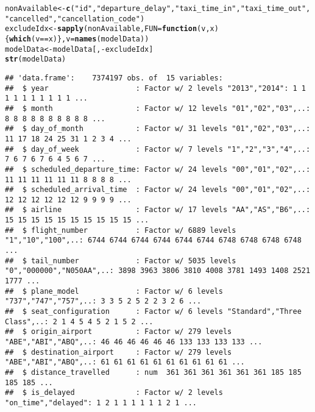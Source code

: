 \documentclass{article}\usepackage[]{graphicx}\usepackage[]{color}
\makeatletter
\newcommand{\hlstr}[1]{\textcolor[rgb]{0.192,0.494,0.8}{#1}}%
\newcommand{\hlopt}[1]{\textcolor[rgb]{0,0,0}{#1}}%
\newcommand{\hlstd}[1]{\textcolor[rgb]{0.345,0.345,0.345}{#1}}%
\newcommand{\hlkwa}[1]{\textcolor[rgb]{0.161,0.373,0.58}{\textbf{#1}}}%
\newcommand{\hlkwb}[1]{\textcolor[rgb]{0.69,0.353,0.396}{#1}}%
\newcommand{\hlkwc}[1]{\textcolor[rgb]{0.333,0.667,0.333}{#1}}%
\newcommand{\hlkwd}[1]{\textcolor[rgb]{0.737,0.353,0.396}{\textbf{#1}}}%
\newenvironment{kframe}{%
 \def\at@end@of@kframe{}%
 \ifinner\ifhmode%
  \def\at@end@of@kframe{\end{minipage}}%
  \begin{minipage}{\columnwidth}%
 \fi\fi%
 \def\FrameCommand##1{\hskip\@totalleftmargin \hskip-\fboxsep
 \colorbox{shadecolor}{##1}\hskip-\fboxsep
     \hskip-\linewidth \hskip-\@totalleftmargin \hskip\columnwidth}%
 \MakeFramed {\advance\hsize-\width
   \@totalleftmargin\z@ \linewidth\hsize
   \@setminipage}}%
 {\par\unskip\endMakeFramed%
 \at@end@of@kframe}
\newenvironment{knitrout}{}{} %
\makeatother
\begin{document}
\begin{knitrout}
\color{fgcolor}\begin{kframe}
\begin{alltt}
\hlstd{nonAvailable} \hlkwb{<-} \hlkwd{c}\hlstd{(}\hlstr{"id"}\hlstd{,} \hlstr{"departure_delay"}\hlstd{,} \hlstr{"taxi_time_in"}\hlstd{,} \hlstr{"taxi_time_out"}\hlstd{,}
                  \hlstr{"cancelled"}\hlstd{,} \hlstr{"cancellation_code"}\hlstd{)}
\hlstd{excludeIdx} \hlkwb{<-} \hlkwd{sapply}\hlstd{(nonAvailable,} \hlkwc{FUN}\hlstd{=}\hlkwa{function}\hlstd{(}\hlkwc{v}\hlstd{,} \hlkwc{x}\hlstd{)\{} \hlkwd{which}\hlstd{(v}\hlopt{==}\hlstd{x)\},} \hlkwc{v}\hlstd{=}\hlkwd{names}\hlstd{(modelData))}
\hlstd{modelData} \hlkwb{<-} \hlstd{modelData[,}\hlopt{-}\hlstd{excludeIdx]}
\hlkwd{str}\hlstd{(modelData)}
\end{alltt}
\begin{verbatim}
## 'data.frame':	7374197 obs. of  15 variables:
##  $ year                    : Factor w/ 2 levels "2013","2014": 1 1 1 1 1 1 1 1 1 1 ...
##  $ month                   : Factor w/ 12 levels "01","02","03",..: 8 8 8 8 8 8 8 8 8 8 ...
##  $ day_of_month            : Factor w/ 31 levels "01","02","03",..: 11 17 18 24 25 31 1 2 3 4 ...
##  $ day_of_week             : Factor w/ 7 levels "1","2","3","4",..: 7 6 7 6 7 6 4 5 6 7 ...
##  $ scheduled_departure_time: Factor w/ 24 levels "00","01","02",..: 11 11 11 11 11 11 8 8 8 8 ...
##  $ scheduled_arrival_time  : Factor w/ 24 levels "00","01","02",..: 12 12 12 12 12 12 9 9 9 9 ...
##  $ airline                 : Factor w/ 17 levels "AA","AS","B6",..: 15 15 15 15 15 15 15 15 15 15 ...
##  $ flight_number           : Factor w/ 6889 levels "1","10","100",..: 6744 6744 6744 6744 6744 6744 6748 6748 6748 6748 ...
##  $ tail_number             : Factor w/ 5035 levels "0","000000","N050AA",..: 3898 3963 3806 3810 4008 3781 1493 1408 2521 1777 ...
##  $ plane_model             : Factor w/ 6 levels "737","747","757",..: 3 3 5 2 5 2 2 3 2 6 ...
##  $ seat_configuration      : Factor w/ 6 levels "Standard","Three Class",..: 2 1 4 5 4 5 2 1 5 2 ...
##  $ origin_airport          : Factor w/ 279 levels "ABE","ABI","ABQ",..: 46 46 46 46 46 46 133 133 133 133 ...
##  $ destination_airport     : Factor w/ 279 levels "ABE","ABI","ABQ",..: 61 61 61 61 61 61 61 61 61 61 ...
##  $ distance_travelled      : num  361 361 361 361 361 361 185 185 185 185 ...
##  $ is_delayed              : Factor w/ 2 levels "on_time","delayed": 1 2 1 1 1 1 1 1 2 1 ...
\end{verbatim}
\end{kframe}
\end{knitrout}
\end{document}
